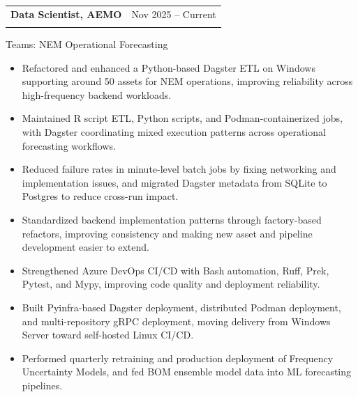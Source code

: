\documentclass[10pt,a4paper]{article}
\makeatletter
\newenvironment{resumejob}[3]{
  \par\addvspace{0.45em}
  \noindent\begin{tabularx}{\textwidth}{@{}>{\raggedright\arraybackslash}X>{\raggedleft\arraybackslash}p{0.3\textwidth}@{}}
    \textbf{\textcolor{textdark}{#1}} & \textcolor{mutedtext}{#2} \\
    \multicolumn{2}{@{}l@{}}{\textit{\textcolor{mutedtext}{#3}}}
  \end{tabularx}
  \vspace{-0.55em}
}{
  \par\addvspace{0.2em}
}
\makeatother
\begin{document}
\begin{resumejob}{Data Scientist, AEMO}{Nov 2025 -- Current}{Melbourne}
Teams: NEM Operational Forecasting
\begin{itemize}
  \item Refactored and enhanced a Python-based Dagster ETL on Windows supporting around 50 assets for NEM operations, improving reliability across high-frequency backend workloads.
  \item Maintained R script ETL, Python scripts, and Podman-containerized jobs, with Dagster coordinating mixed execution patterns across operational forecasting workflows.
  \item Reduced failure rates in minute-level batch jobs by fixing networking and implementation issues, and migrated Dagster metadata from SQLite to Postgres to reduce cross-run impact.
  \item Standardized backend implementation patterns through factory-based refactors, improving consistency and making new asset and pipeline development easier to extend.
  \item Strengthened Azure DevOps CI/CD with Bash automation, Ruff, Prek, Pytest, and Mypy, improving code quality and deployment reliability.
  \item Built Pyinfra-based Dagster deployment, distributed Podman deployment, and multi-repository gRPC deployment, moving delivery from Windows Server toward self-hosted Linux CI/CD.
  \item Performed quarterly retraining and production deployment of Frequency Uncertainty Models, and fed BOM ensemble model data into ML forecasting pipelines.
\end{itemize}
\end{resumejob}
\end{document}
